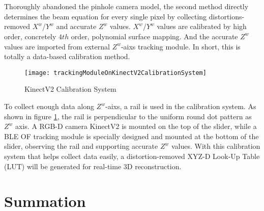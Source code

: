 \\\\%
Thoroughly abandoned the pinhole camera model, the second method directly determines the beam equation for every single pixel by collecting distortions-removed \(X^{w}\)/\(Y^{w}\) and accurate \(Z^{w}\) values. \(X^{w}\)/\(Y^{w}\) values are calibrated by high order, concretely \(4th\) order, polynomial surface mapping. And the accurate \(Z^{w}\) values are imported from external \(Z^{w}\)-aixs tracking module. In short, this is totally a data-based calibration method.%
%
\begin{figure}[H]
\centering
\texttt{[image: trackingModuleOnKinectV2CalibrationSystem]}
\caption{KinectV2 Calibration System}
\label{trackingModuleOnKinectV2CalibrationSystem}
\end{figure}%
%
To collect enough data along \(Z^{w}\)-aixs, a rail is used in the calibration system. As shown in figure \ref{trackingModuleOnKinectV2CalibrationSystem}, the rail is perpendicular to the uniform round dot pattern as \(Z^{w}\) axis. A RGB-D camera KinectV2 is mounted on the top of the slider, while a BLE OF tracking module is specially designed and mounted at the bottom of the slider, observing the rail and supporting accurate \(Z^{w}\) values. With this calibration system that helps collect data easily, a distortion-removed XYZ-D Look-Up Table (LUT) will be generated for real-time 3D reconstruction.%

\section{Summation}

